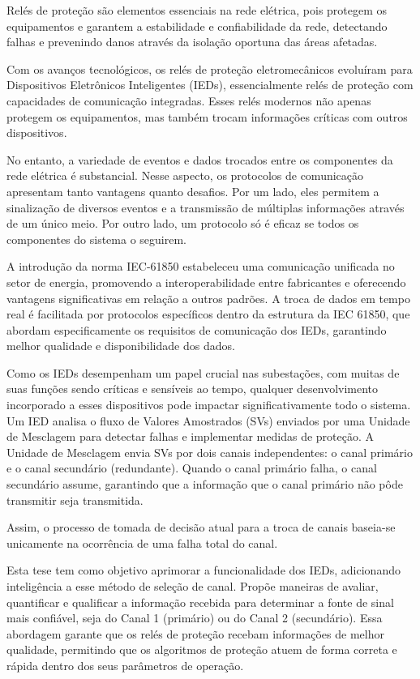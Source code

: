 \begin{abstractotherlanguage}
	
	Relés de proteção são elementos essenciais na rede elétrica, pois protegem os equipamentos e garantem a estabilidade e confiabilidade da rede, detectando falhas e prevenindo danos através da isolação oportuna das áreas afetadas.
	
	Com os avanços tecnológicos, os relés de proteção eletromecânicos evoluíram para Dispositivos Eletrônicos Inteligentes (IEDs), essencialmente relés de proteção com capacidades de comunicação integradas. Esses relés modernos não apenas protegem os equipamentos, mas também trocam informações críticas com outros dispositivos.
	
	No entanto, a variedade de eventos e dados trocados entre os componentes da rede elétrica é substancial. Nesse aspecto, os protocolos de comunicação apresentam tanto vantagens quanto desafios. Por um lado, eles permitem a sinalização de diversos eventos e a transmissão de múltiplas informações através de um único meio. Por outro lado, um protocolo só é eficaz se todos os componentes do sistema o seguirem.
	
	A introdução da norma IEC-61850 estabeleceu uma comunicação unificada no setor de energia, promovendo a interoperabilidade entre fabricantes e oferecendo vantagens significativas em relação a outros padrões. A troca de dados em tempo real é facilitada por protocolos específicos dentro da estrutura da IEC 61850, que abordam especificamente os requisitos de comunicação dos IEDs, garantindo melhor qualidade e disponibilidade dos dados.
	
	Como os IEDs desempenham um papel crucial nas subestações, com muitas de suas funções sendo críticas e sensíveis ao tempo, qualquer desenvolvimento incorporado a esses dispositivos pode impactar significativamente todo o sistema. Um IED analisa o fluxo de Valores Amostrados (SVs) enviados por uma Unidade de Mesclagem para detectar falhas e implementar medidas de proteção. A Unidade de Mesclagem envia SVs por dois canais independentes: o canal primário e o canal secundário (redundante). Quando o canal primário falha, o canal secundário assume, garantindo que a informação que o canal primário não pôde transmitir seja transmitida.
	
	Assim, o processo de tomada de decisão atual para a troca de canais baseia-se unicamente na ocorrência de uma falha total do canal.
	
	Esta tese tem como objetivo aprimorar a funcionalidade dos IEDs, adicionando inteligência a esse método de seleção de canal. Propõe maneiras de avaliar, quantificar e qualificar a informação recebida para determinar a fonte de sinal mais confiável, seja do Canal 1 (primário) ou do Canal 2 (secundário). Essa abordagem garante que os relés de proteção recebam informações de melhor qualidade, permitindo que os algoritmos de proteção atuem de forma correta e rápida dentro dos seus parâmetros de operação.
		
\end{abstractotherlanguage}

